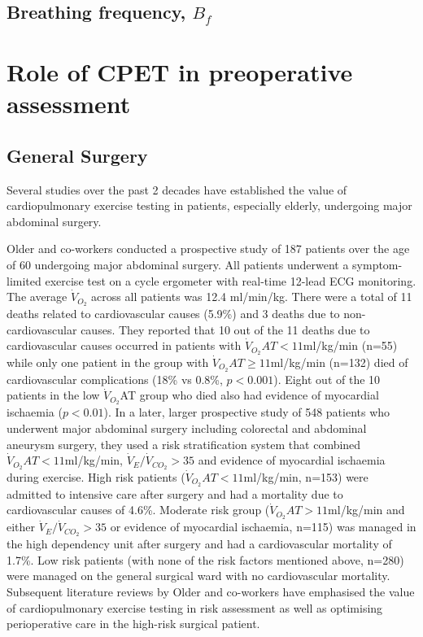 \subsection{Breathing frequency, $B_f$}

\section{Role of CPET in preoperative assessment}
\subsection{General Surgery}
Several studies over the past 2 decades have established the value of cardiopulmonary exercise testing in patients, especially elderly, undergoing major abdominal surgery. 

Older and co-workers conducted a prospective study of 187 patients over the age of 60 undergoing major abdominal surgery. All patients underwent a symptom-limited exercise test on a cycle ergometer with real-time 12-lead ECG monitoring. The average $\dot{V}_{O_2}$ across all patients was 12.4 ml/min/kg. There were a total of 11 deaths related to cardiovascular causes (5.9\%) and 3 deaths due to non-cardiovascular causes. They reported that 10 out of the 11 deaths due to cardiovascular causes occurred in patients with $\dot{V}_{O_2}AT<11$ml/kg/min (n=55) while only one patient in the group with $\dot{V}_{O_2}AT\geq11$ml/kg/min (n=132) died of cardiovascular complications (18\% vs 0.8\%, $p<0.001$). Eight out of the 10 patients in the low $\dot{V}_{O_2}$AT group who died also had evidence of myocardial ischaemia ($p<0.01$).\parencite{older_preoperative_1993} 
In a later, larger prospective study of 548 patients who underwent major abdominal surgery including colorectal and abdominal aneurysm surgery, they used a risk stratification system that combined $\dot{V}_{O_2}AT<11$ml/kg/min, $\dot{V}_E/\dot{V}_{CO_2}>35$ and evidence of myocardial ischaemia during exercise. High risk patients ($\dot{V}_{O_2}AT<11$ml/kg/min, n=153) were admitted to intensive care after surgery and had a mortality due to cardiovascular causes of 4.6\%. Moderate risk group ($\dot{V}_{O_2}AT>11$ml/kg/min and either $\dot{V}_E/\dot{V}_{CO_2}>35$ or evidence of myocardial ischaemia, n=115) was managed in the high dependency unit after surgery and had a cardiovascular mortality of 1.7\%. Low risk patients (with none of the risk factors mentioned above, n=280) were managed on the general surgical ward with no cardiovascular mortality.\parencite{older_cardiopulmonary_1999} Subsequent literature reviews by Older and co-workers have emphasised the value of cardiopulmonary exercise testing in risk assessment as well as optimising perioperative care in the high-risk surgical patient. \parencite{older_preoperative_2000, older_clinical_2004, older_preoperative_2005}

